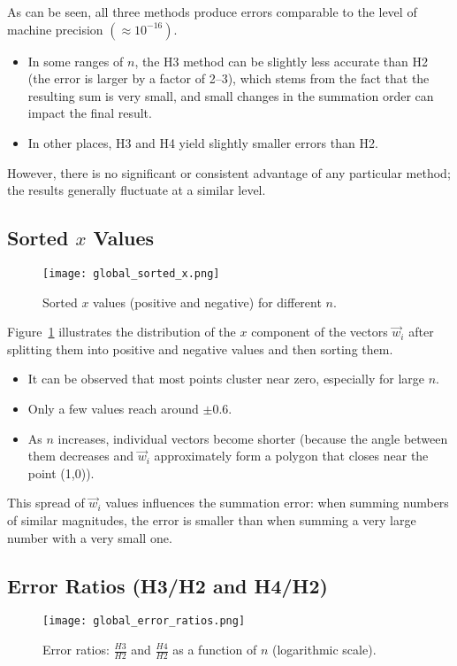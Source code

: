 \documentclass[a4paper,12pt]{article}
\begin{document}
As can be seen, all three methods produce errors comparable to the level of machine precision \((\approx 10^{-16})\).  
\begin{itemize}
    \item In some ranges of \(n\), the H3 method can be slightly less accurate than H2 (the error is larger by a factor of 2--3), which stems from the fact that the resulting sum is very small, and small changes in the summation order can impact the final result.
    \item In other places, H3 and H4 yield slightly smaller errors than H2.
\end{itemize}
However, there is no significant or consistent advantage of any particular method; the results generally fluctuate at a similar level.

\subsection{Sorted \(x\) Values}
\begin{figure}[H]
    \centering
    \texttt{[image: global\_sorted\_x.png]}
    \caption{Sorted \(x\) values (positive and negative) for different \(n\).}
    \label{fig:global_sorted_x}
\end{figure}

Figure~\ref{fig:global_sorted_x} illustrates the distribution of the \(x\) component of the vectors \(\vec{w}_i\) after splitting them into positive and negative values and then sorting them.  
\begin{itemize}
    \item It can be observed that most points cluster near zero, especially for large \(n\). 
    \item Only a few values reach around \(\pm 0.6\). 
    \item As \(n\) increases, individual vectors become shorter (because the angle between them decreases and \(\vec{w}_i\) approximately form a polygon that closes near the point (1,0)).
\end{itemize}
This spread of \(\vec{w}_i\) values influences the summation error: when summing numbers of similar magnitudes, the error is smaller than when summing a very large number with a very small one.

\subsection{Error Ratios (H3/H2 and H4/H2)}
\begin{figure}[H]
    \centering
    \texttt{[image: global\_error\_ratios.png]}
    \caption{Error ratios: \( \frac{H3}{H2} \) and \( \frac{H4}{H2} \) as a function of \(n\) (logarithmic scale).}
    \label{fig:global_error_ratios}
\end{figure}
\end{document}
